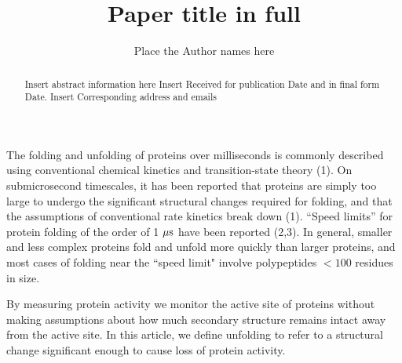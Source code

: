 \documentclass{biophys}
\begin{document}
\setcounter{page}{1} %

\title{Paper title in full}


\author{Place the Author names here}

\address{Place the Author addresses here}





\begin{abstract}%
{Insert abstract information here}%
{Insert Received for publication Date and in final form Date.}%
{Insert Corresponding address and emails}%
\end{abstract}

\maketitle %



The folding and unfolding of proteins over milliseconds is commonly described using conventional chemical kinetics and transition-state theory (1). On submicrosecond timescales, it has been reported that proteins are simply too large to undergo the significant structural changes required for folding, and that the assumptions of conventional rate kinetics break down (1). ``Speed limits'' for protein folding of the order of 1 $\mu{\rm s}$ have been reported (2,3). In general, smaller and less complex proteins fold and unfold more quickly than larger proteins, and most cases of folding near the ``speed limit" involve polypeptides ${<}100$ residues in size.

By measuring protein activity we monitor the active site of proteins without making assumptions about how much secondary structure remains intact away from the active site. In this article, we define unfolding to refer to a structural change significant enough to cause loss of protein activity.
\end{document}
